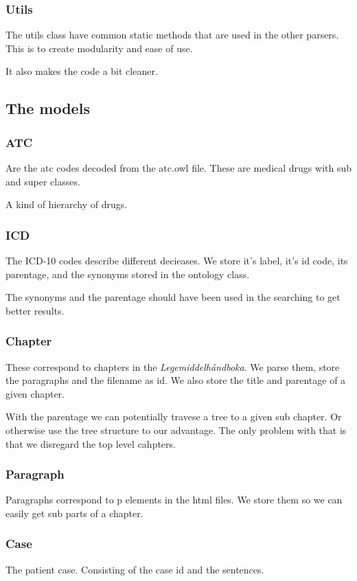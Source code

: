 \documentclass[12pt, a4paper]{article}
\begin{document}
\subsubsection{Utils}
The utils class have common static methods that are used in the other parsers.
This is to create modularity and ease of use. 

It also makes the code a bit cleaner. 

\subsection{The models}
\subsubsection{ATC}
Are the atc codes decoded from the atc.owl file. These are medical drugs with
sub and super classes.

A kind of hierarchy of drugs. 

\subsubsection{ICD}
The ICD-10 codes describe different decieases. 
We store it's label, it's id code, its parentage, and the synonyms stored in
the ontology class. 

The synonyms and the parentage should have been used in the searching to get
better results. 

\subsubsection{Chapter}
These correspond to chapters in the \textit{Legemiddelhåndboka}. 
We parse them, store the paragraphs and the filename as id. 
We also store the title and parentage of a given chapter. 

With the parentage we can potentially travese a tree to a given sub chapter. Or
otherwise use the tree structure to our advantage. The only problem with that
is that we disregard the top level cahpters. 

\subsubsection{Paragraph}
Paragraphs correspond to p elements in the html files. 
We store them so we can easily get sub parts of a chapter.

\subsubsection{Case}
The patient case. Consisting of the case id and the sentences. 
\end{document}
